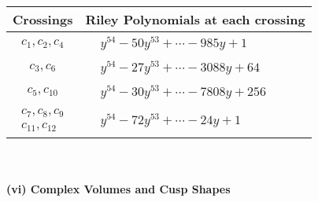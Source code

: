 \documentclass[1p]{elsarticle_modified}
\theoremstyle{definition}
\begin{document}
\begin{tabular}{m{50pt}|m{274pt}}
Crossings & \hspace{64pt}Riley Polynomials at each crossing \\
\hline $$\begin{aligned}c_{1},c_{2},c_{4}\end{aligned}$$&$\begin{aligned}
&y^{54}-50 y^{53}+\cdots-985 y+1
\end{aligned}$\\
\hline $$\begin{aligned}c_{3},c_{6}\end{aligned}$$&$\begin{aligned}
&y^{54}-27 y^{53}+\cdots-3088 y+64
\end{aligned}$\\
\hline $$\begin{aligned}c_{5},c_{10}\end{aligned}$$&$\begin{aligned}
&y^{54}-30 y^{53}+\cdots-7808 y+256
\end{aligned}$\\
\hline $$\begin{aligned}c_{7},c_{8},c_{9}\\c_{11},c_{12}\end{aligned}$$&$\begin{aligned}
&y^{54}-72 y^{53}+\cdots-24 y+1
\end{aligned}$\\
\hline
\end{tabular}\\~\\
\newpage\flushleft \textbf{(vi) Complex Volumes and Cusp Shapes}
\end{document}

